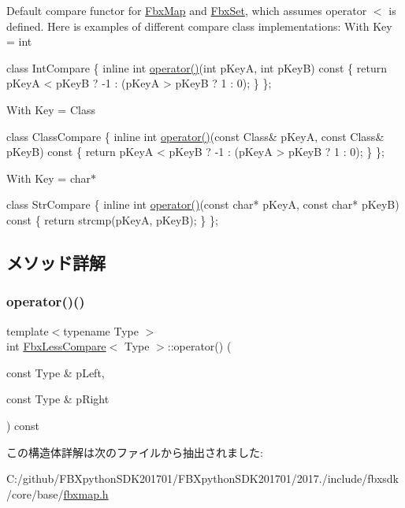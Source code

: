 Default compare functor for \hyperlink{class_fbx_map}{Fbx\+Map} and \hyperlink{class_fbx_set}{Fbx\+Set}, which assumes operator $<$ is defined. Here is examples of different compare class implementations\+: With Key = int 
\begin{DoxyCode}
\textcolor{keyword}{class }IntCompare
\{
    \textcolor{keyword}{inline} \textcolor{keywordtype}{int} \hyperlink{struct_fbx_less_compare_ae928c1cd53fbd36a8ed7497b4d6accc9}{operator()}(\textcolor{keywordtype}{int} pKeyA, \textcolor{keywordtype}{int} pKeyB)\textcolor{keyword}{ const}
\textcolor{keyword}{    }\{
        \textcolor{keywordflow}{return} pKeyA < pKeyB ? -1 : (pKeyA > pKeyB ? 1 : 0);
    \}
\};
\end{DoxyCode}
 With Key = Class 
\begin{DoxyCode}
\textcolor{keyword}{class }ClassCompare
\{
    \textcolor{keyword}{inline} \textcolor{keywordtype}{int} \hyperlink{struct_fbx_less_compare_ae928c1cd53fbd36a8ed7497b4d6accc9}{operator()}(\textcolor{keyword}{const} Class& pKeyA, \textcolor{keyword}{const} Class& pKeyB)\textcolor{keyword}{ const}
\textcolor{keyword}{    }\{
        \textcolor{keywordflow}{return} pKeyA < pKeyB ? -1 : (pKeyA > pKeyB ? 1 : 0);
    \}
\};
\end{DoxyCode}
 With Key = char$\ast$ 
\begin{DoxyCode}
\textcolor{keyword}{class }StrCompare
\{
    \textcolor{keyword}{inline} \textcolor{keywordtype}{int} \hyperlink{struct_fbx_less_compare_ae928c1cd53fbd36a8ed7497b4d6accc9}{operator()}(\textcolor{keyword}{const} \textcolor{keywordtype}{char}* pKeyA, \textcolor{keyword}{const} \textcolor{keywordtype}{char}* pKeyB)\textcolor{keyword}{ const}
\textcolor{keyword}{    }\{
        \textcolor{keywordflow}{return} strcmp(pKeyA, pKeyB);
    \}
\};
\end{DoxyCode}
 

\subsection{メソッド詳解}
\mbox{\label{struct_fbx_less_compare_ae928c1cd53fbd36a8ed7497b4d6accc9}} 
\subsubsection{\texorpdfstring{operator()()}{operator()()}}
{\footnotesize\ttfamily template$<$typename Type $>$ \\
int \hyperlink{struct_fbx_less_compare}{Fbx\+Less\+Compare}$<$ Type $>$\+::operator() (\begin{DoxyParamCaption}\item[{const Type \&}]{p\+Left,  }\item[{const Type \&}]{p\+Right }\end{DoxyParamCaption}) const}



この構造体詳解は次のファイルから抽出されました\+:\begin{DoxyCompactItemize}
\item 
C\+:/github/\+F\+B\+Xpython\+S\+D\+K201701/\+F\+B\+Xpython\+S\+D\+K201701/2017./include/fbxsdk/core/base/\hyperlink{fbxmap_8h}{fbxmap.\+h}\end{DoxyCompactItemize}
